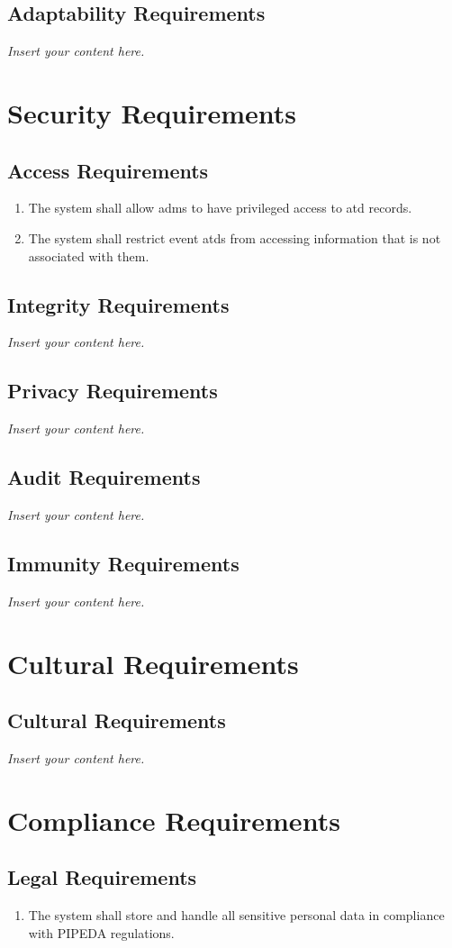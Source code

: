 \documentclass[12pt]{article}
\newcommand{\lips}{\textit{Insert your content here.}}
\begin{document}
\subsection{Adaptability Requirements}
\lips

\section{Security Requirements}
\subsection{Access Requirements}
\begin{enumerate}[align=left,
  leftmargin=*,
  labelsep=1em,
  itemindent=0em,
  label=\bfseries AC-\arabic*:]
  \item The system shall allow \glspl{adm} to have privileged access to \gls{atd} records.
  \item The system shall restrict event \glspl{atd} from accessing information that is not associated with them.
\end{enumerate}
\subsection{Integrity Requirements}
\lips
\subsection{Privacy Requirements}
\lips
\subsection{Audit Requirements}
\lips
\subsection{Immunity Requirements}
\lips

\section{Cultural Requirements}
\subsection{Cultural Requirements}
\lips

\section{Compliance Requirements}
\subsection{Legal Requirements}
\begin{enumerate}[align=left,
  leftmargin=*,
  labelsep=1em,
  itemindent=0em,
  label=\bfseries LG-\arabic*:]
  \item The system shall store and handle all sensitive personal data in compliance with
    PIPEDA regulations.
\end{enumerate}
\end{document}
